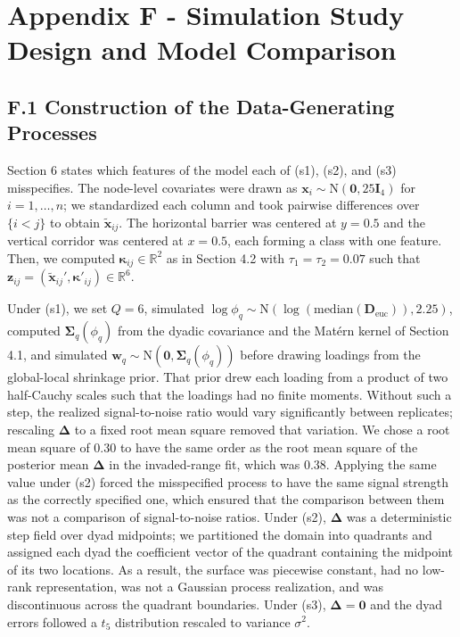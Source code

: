 \documentclass{article}
\begin{document}
\section*{Appendix F - Simulation Study Design and Model Comparison}

\subsection*{F.1 Construction of the Data-Generating Processes}

Section 6 states which features of the model each of (s1), (s2), and (s3) misspecifies. The node-level covariates were drawn as $\mathbf{x}_i\sim\text{N}(\boldsymbol{0},25\mathbf{I}_4)$ for $i=1,\dots,n$; we standardized each column and took pairwise differences over $\{i<j\}$ to obtain $\widetilde{\mathbf{x}}_{ij}$. The horizontal barrier was centered at $y=0.5$ and the vertical corridor was centered at $x=0.5$, each forming a class with one feature. Then, we computed $\boldsymbol{\kappa}_{ij}\in\mathbb{R}^2$ as in Section 4.2 with $\tau_1=\tau_2=0.07$ such that $\mathbf{z}_{ij}=(\widetilde{\mathbf{x}}_{ij}',\boldsymbol{\kappa}'_{ij})\in\mathbb{R}^6$.

Under (s1), we set $Q=6$, simulated $\log\phi_q\sim\text{N}(\log(\text{median}(\mathbf{D}_{\text{euc}})),2.25)$, computed $\boldsymbol{\Sigma}_q(\phi_q)$ from the dyadic covariance and the Matérn kernel of Section 4.1, and simulated $\mathbf{w}_q\sim\text{N}(\boldsymbol{0},\boldsymbol{\Sigma}_q(\phi_q))$ before drawing loadings from the global-local shrinkage prior. 
That prior drew each loading from a product of two half-Cauchy scales such that the loadings had no finite moments. Without such a step, the realized signal-to-noise ratio would vary significantly between replicates; rescaling $\boldsymbol{\Delta}$ to a fixed root mean square removed that variation. We chose a root mean square of 0.30 to have the same order as the root mean square of the posterior mean $\boldsymbol{\Delta}$ in the invaded-range fit, which was 0.38. Applying the same value under (s2) forced the misspecified process to have the same signal strength as the correctly specified one, which ensured that the comparison between them was not a comparison of signal-to-noise ratios.
Under (s2), $\boldsymbol{\Delta}$ was a deterministic step field over dyad midpoints; we partitioned the domain into quadrants and assigned each dyad the coefficient vector of the quadrant containing the midpoint of its two locations. As a result, the surface was piecewise constant, had no low-rank representation, was not a Gaussian process realization, and was discontinuous across the quadrant boundaries. Under (s3), $\boldsymbol{\Delta}=\boldsymbol{0}$ and the dyad errors followed a $t_5$ distribution rescaled to variance $\sigma^2$.
\end{document}
